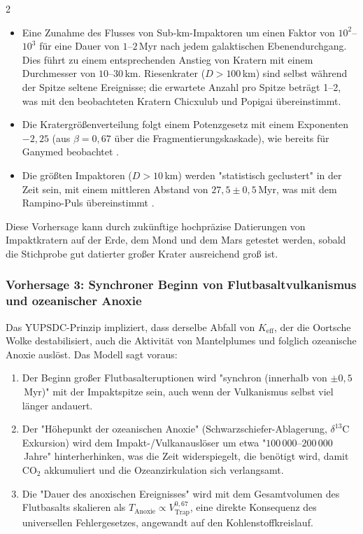 \documentclass[11pt,a4paper]{article}
\begin{document}
\begin{multicols}{2}
		\begin{itemize}
			\item Eine Zunahme des Flusses von Sub‑km-Impaktoren um einen Faktor von \(10^{2}\)–\(10^{3}\) für eine Dauer von \(1\)–\(2\) Myr nach jedem galaktischen Ebenendurchgang. Dies führt zu einem entsprechenden Anstieg von Kratern mit einem Durchmesser von \(10\)–\(30\) km. Riesenkrater (\(D>100\) km) sind selbst während der Spitze seltene Ereignisse; die erwartete Anzahl pro Spitze beträgt 1–2, was mit den beobachteten Kratern Chicxulub und Popigai übereinstimmt.
			\item Die Kratergrößenverteilung folgt einem Potenzgesetz mit einem Exponenten
			\(-2,25\) (aus \(\beta=0,67\) über die Fragmentierungskaskade), wie
			bereits für Ganymed beobachtet \cite{Schenk2004}.
			\item Die größten Impaktoren (\(D>10\) km) werden "statistisch
			geclustert" in der Zeit sein, mit einem mittleren Abstand von \(27,5 \pm 0,5\) Myr,
			was mit dem Rampino-Puls übereinstimmt \cite{Rampino2021}.
		\end{itemize}
		
		Diese Vorhersage kann durch zukünftige hochpräzise Datierungen von Impaktkratern auf der Erde, dem Mond und dem Mars getestet werden, sobald die Stichprobe gut datierter großer Krater ausreichend groß ist.
		
		\subsubsection{Vorhersage 3: Synchroner Beginn von Flutbasaltvulkanismus und ozeanischer Anoxie}
		
		Das YUPSDC-Prinzip impliziert, dass derselbe Abfall von \(K_{\mathrm{eff}}\), der
		die Oortsche Wolke destabilisiert, auch die Aktivität von Mantelplumes und folglich
		ozeanische Anoxie auslöst. Das Modell sagt voraus:
		
		\begin{enumerate}
			\item Der Beginn großer Flutbasalteruptionen wird "synchron
			(innerhalb von \(\pm 0,5\) Myr)" mit der Impaktspitze sein, auch wenn der Vulkanismus
			selbst viel länger andauert.
			\item Der "Höhepunkt der ozeanischen Anoxie" (Schwarzschiefer-Ablagerung, \(\delta^{13}\)C
			Exkursion) wird dem Impakt-/Vulkanauslöser um etwa
			"\(100\,000\)–\(200\,000\) Jahre" hinterherhinken, was die Zeit widerspiegelt, die benötigt wird, damit
			CO\(_2\) akkumuliert und die Ozeanzirkulation sich verlangsamt.
			\item Die "Dauer des anoxischen Ereignisses" wird mit dem Gesamtvolumen des Flutbasalts skalieren als \(T_{\text{Anoxie}} \propto V_{\text{Trap}}^{0,67}\),
			eine direkte Konsequenz des universellen Fehlergesetzes, angewandt auf den Kohlenstoffkreislauf.
		\end{enumerate}
		

\end{multicols}
\end{document}
